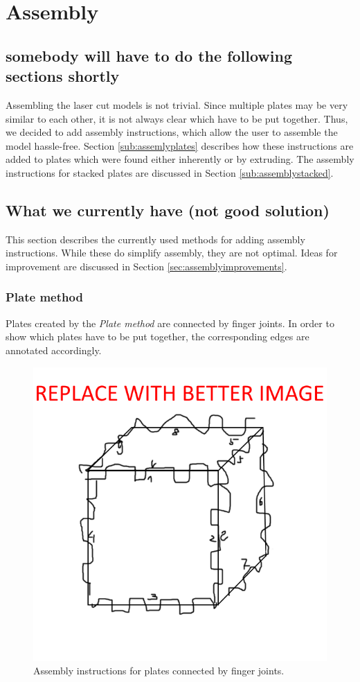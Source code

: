 \documentclass[../ClassicThesis.tex]{subfiles}
\begin{document}
\chapter{Assembly}\label{ch:assembly}
\section{somebody will have to do the following sections shortly}

Assembling the laser cut models is not trivial. Since multiple plates may be very similar to each other, it is not always clear which have to be put together. Thus, we decided to add assembly instructions, which allow the user to assemble the model hassle-free. Section \ref{sub:assemlyplates} describes how these instructions are added to plates which were found either inherently or by extruding. The assembly instructions for stacked plates are discussed in Section \ref{sub:assemblystacked}.

\section{What we currently have (not good solution)}

This section describes the currently used methods for adding assembly instructions. While these do simplify assembly, they are not optimal. Ideas for improvement are discussed in Section \ref{sec:assemblyimprovements}.

\subsection{Plate method}\label{sub:assemblyplates}


Plates created by the \emph{Plate method} \fabmethod are connected by finger joints. In order to show which plates have to be put together, the corresponding edges are annotated accordingly.

\begin{figure}
    \centering
    \includegraphics[width=0.5\columnwidth]{Images/assembly_plates.png}
    \caption{Assembly instructions for plates connected by finger joints.}
    \label{fig:assemblyplates}
\end{figure}
\end{document}
